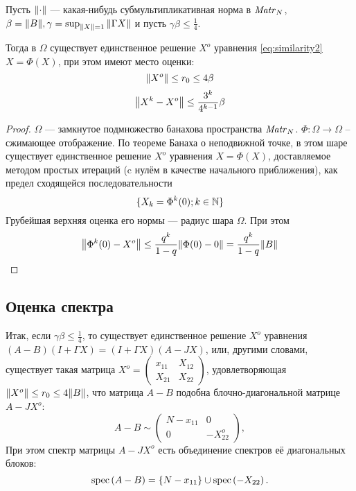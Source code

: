 \begin{lemma}
    Пусть \( {\left\|{\cdot}\right\|} \) --- какая-нибудь субмультипликативная норма в \( \mathit{Matr}_{N} {} \),
    \( \beta={\left\|{B}\right\|}, \gamma=\sup_{{\left\|{X}\right\|}=1}{\left\|{\Gamma X}\right\|} \)
    и пусть
    \( \gamma\beta\leq\frac14. \)

    Тогда в \( \Omega \) существует единственное решение \( X^o \) уравнения
    \eqref{eq:similarity2} \( X=\Phi(X) \),
    при этом имеют место оценки:
    \[
        {\left\|{X^o}\right\|} \leq r_0 \leq 4\beta
        \]
    \[
        {\left\|{X^k - X^o}\right\|} \leq \frac{3^k}{4^{k-1}}\beta
        \]
\end{lemma}
\begin{proof}
    \( \Omega \) --- замкнутое подмножество банахова пространства \( \mathit{Matr}_{N} {} \).
    \( \Phi: \Omega\to\Omega \) -- сжимающее отображение.
    По теореме Банаха о неподвижной точке, в этом шаре существует единственное решение \( X^o \)
    уравнения \( X = \Phi (X) \),
    доставляемое методом простых итераций (c нулём в качестве начального приближения),
    как предел сходящейся последовательности
    \[
        \{X_k = \Phi^k(0); k\in\mathbb{N}\}
        \]
    Грубейшая верхняя оценка его нормы --- радиус шара \( \Omega \).
    При этом \[ {\left\|{\Phi^k(0) - X^o}\right\|} \leq \frac{q^k}{1-q} {\left\|{\Phi(0) - 0}\right\|} = \frac{q^k}{1-q}{\left\|{B}\right\|} \]
\end{proof}

\subsection{Оценка спектра}
Итак, если \( \gamma\beta \leq \frac14 \),
то существует единственное решение \( X^o \) уравнения
\( (A-B)(I+\Gamma X) = (I+\Gamma X)(A-JX) \),
или, другими словами, существует такая матрица
\( X^o =
\begin{pmatrix}
    x_{11} & X_{12} \\
    X_{21} & X_{22}
\end{pmatrix}
\),
удовлетворяющая \( {\left\|{X^o}\right\|} \leq r_0 \leq 4{\left\|{B}\right\|} \),
что матрица \( A-B \) подобна блочно-диагональной матрице \( A - JX^o \):
\[
    A-B \sim
    \begin{pmatrix}
        N - x_{11} & 0 \\
        0          & -X_{22}^o
    \end{pmatrix},
    \]
При этом спектр матрицы \( A - JX^o \) есть объединение спектров
её диагональных блоков:
\[ \mathrm{spec}\left({A-B}\right) = \left\{N - x_{11}\right\} \cup \mathrm{spec}\left({-X_{22}}\right). \]


